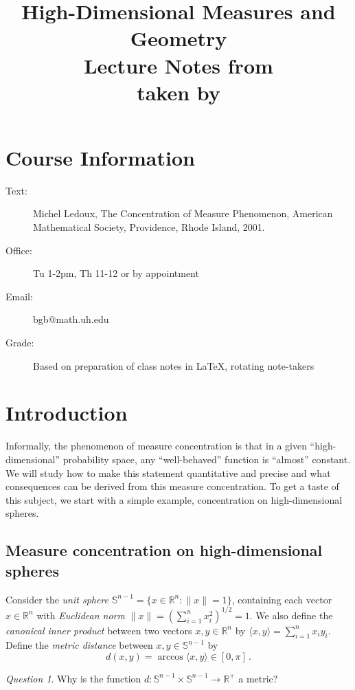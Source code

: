 \documentclass[12pt]{article}
\date{} %
\author{} %
\title{{\bf High-Dimensional Measures and Geometry}\\
Lecture Notes from \lecdat\\[0.1cm] \small taken by \notesby}
\theoremstyle{remark}
\newtheorem{question}[thm]{Question}
\def\Snm1{\mathbb S^{n-1}}
\def\Rn{\mathbb R^n}
\begin{document}
\maketitle

\setcounter{section}{-1}

\section{Course Information}

\begin{description}
\item[Text:] Michel Ledoux, The Concentration of Measure Phenomenon, American Mathematical Society, Providence, Rhode Island, 2001.
\item[Office:] Tu 1-2pm, Th 11-12 or by appointment
\item[Email:] bgb@math.uh.edu
\item[Grade:] Based on preparation of class notes in LaTeX, rotating note-takers 
\end{description}

\section{Introduction}

Informally, the phenomenon of measure concentration is that in a given ``high-dimensional'' probability space, any
``well-behaved'' function is ``almost'' constant. We will study how to make this statement quantitative and precise and what consequences can be derived from this measure concentration. To get a taste of this subject, we start with a simple example,
concentration on high-dimensional spheres.

\subsection{Measure concentration on high-dimensional spheres}

Consider the {\em unit sphere} $\Snm1 = \{x \in \Rn: \|x\|=1\}$, containing each vector $x \in \mathbb R^n$
with {\em Euclidean norm} $\|x\|=(\sum_{i=1}^n x_i^2 )^{1/2}=1$. We also define the {\em canonical inner
product} between two vectors $x, y \in \Rn$ by $\langle x,y\rangle =\sum_{i=1}^n x_i y_i$. Define the 
{\em metric distance} between $x,y \in \Snm1$ by
$$
    d(x,y) = \arccos \langle x, y \rangle \in [0,\pi] \, .
$$

\begin{question} Why is the function $d: \Snm1 \times \Snm1 \to \mathbb R^+$ a metric?
\end{question}
\end{document}

